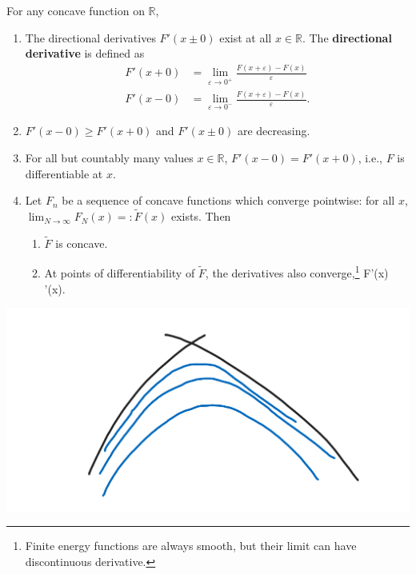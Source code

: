 \begin{theorem}
For any concave function on $\mathbb{R}$, 
\begin{enumerate}
\item
The directional derivatives $F'(x\pm0)$ exist at all $x\in \mathbb{R}$. The \textbf{directional derivative} is defined as
\begin{align*}
F'(x+0)&=\lim_{\varepsilon\to 0^+} \frac{F(x+\varepsilon)-F(x)}{\varepsilon}\\
F'(x-0)&=\lim_{\varepsilon\to 0^-} \frac{F(x+\varepsilon)-F(x)}{\varepsilon}.
\end{align*}
\item $F'(x-0)\ge F'(x+0)$ and $F'(x\pm 0)$ are decreasing.
\item For all but countably many values $x\in \mathbb{R}$, $F'(x-0)=F'(x+0)$, i.e., $F$ is differentiable at $x$.
\item Let $F_n$ be a sequence of concave functions which converge pointwise: for all $x$, $\lim_{N\to \infty} F_N(x)=:\widetilde{F}(x)$ exists. 
Then
\begin{enumerate}
\item
 $\widetilde{F}$ is concave.
\item
At points of differentiability of $\widetilde{F}$, the derivatives also converge,\footnote{Finite energy functions are always smooth, but %
their limit can have discontinuous derivative.
}
\be
F'(x) \to {}'(x).
\ee
\end{enumerate}
\end{enumerate}
\end{theorem}

\begin{center}\includegraphics[scale=.25]{images/2-3}\end{center}

